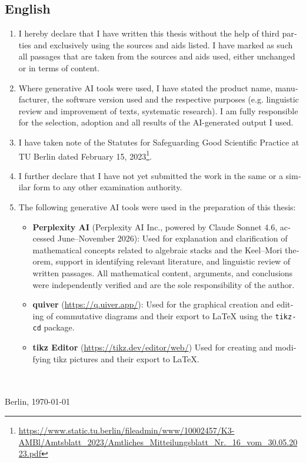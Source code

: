 {\begin{otherlanguage}{english}
\section*{English}
\begin{enumerate}[noitemsep]
\item I hereby declare that I have written this thesis without the help of third parties and exclusively using the sources and aids listed. I have marked as such all passages that are taken from the sources and aids used, either unchanged or in terms of content.
\item Where generative AI tools were used, I have stated the product name, manufacturer, the software version used and the respective purposes (e.g. linguistic review and improvement of texts, systematic research). I am fully responsible for the selection, adoption and all results of the AI-generated output I used.
\item I have taken note of the Statutes for Safeguarding Good Scientific Practice at TU Berlin dated February 15, 2023\footnote{\url{https://www.static.tu.berlin/fileadmin/www/10002457/K3-AMBl/Amtsblatt_2023/Amtliches_Mitteilungsblatt_Nr._16_vom_30.05.2023.pdf}}.
\item I further declare that I have not yet submitted the work in the same or a similar form to any other examination authority.
\item The following generative AI tools were used in the preparation of this thesis:
\begin{itemize}
	\item \textbf{Perplexity AI} (Perplexity AI Inc., powered by Claude Sonnet 4.6, accessed June--November 2026):
	Used for explanation and clarification of mathematical concepts related to algebraic stacks
	and the Keel--Mori theorem, support in identifying relevant literature, and linguistic
	review of written passages. All mathematical content, arguments, and conclusions were
	independently verified and are the sole responsibility of the author.
	\item \textbf{quiver} (\url{https://q.uiver.app/}):
	Used for the graphical creation and editing of commutative diagrams
	and their export to LaTeX using the \texttt{tikz-cd} package.
	\item \textbf{tikz Editor} (\url{https://tikz.dev/editor/web/})
	Used for creating and modifying tikz pictures and their export to LaTeX.
\end{itemize}
\end{enumerate}
\vspace*{4ex}
\makebox[3in][l]{\hrulefill}\\
\textsc{\autor} \\
Berlin, \today
\end{otherlanguage}
\begin{otherlanguage}{ngerman}
\end{otherlanguage}}
